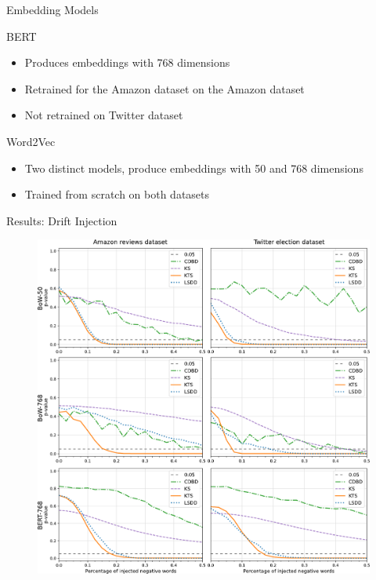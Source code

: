 \documentclass{beamer} %
\begin{document}
	\begin{frame}{Embedding Models}
		\begin{alertblock}{BERT}
			\begin{itemize}
				\item Produces embeddings with 768 dimensions
				\item Retrained for the Amazon dataset on the Amazon dataset
				\item Not retrained on Twitter dataset
			\end{itemize}
		\end{alertblock}
	
		\begin{alertblock}{Word2Vec}
			\begin{itemize}
				\item Two distinct models, produce embeddings with 50 and 768 dimensions
				\item Trained from scratch on both datasets
			\end{itemize}
		\end{alertblock}
	\end{frame}

	{
	\begin{frame}{Results: Drift Injection}
		\begin{figure}[htb!] %
			\centering
			\includegraphics[width=.75\textwidth]{Bilder/drift_induction_all.pdf}
			\label{Fig:drift_induction_all}
		\end{figure}
	\end{frame}
	}
\end{document}
